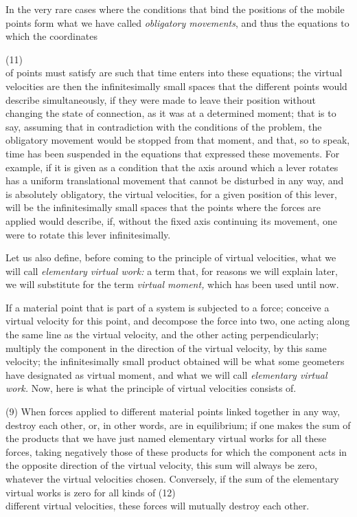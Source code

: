 \documentclass{book}
\begin{document}
In the very rare cases where the conditions that bind the positions of the mobile points form what we have called \textit{obligatory movements}, and thus the equations to which the coordinates 

\newpage
(11)\\
of points must satisfy are such that time enters into these equations; the virtual velocities are then the infinitesimally small spaces that the different points would describe simultaneously, if they were made to leave their position without changing the state of connection, as it was at a determined moment; that is to say, assuming that in contradiction with the conditions of the problem, the obligatory movement would be stopped from that moment, and that, so to speak, time has been suspended in the equations that expressed these movements. For example, if it is given as a condition that the axis around which a lever rotates has a uniform translational movement that cannot be disturbed in any way, and is absolutely obligatory, the virtual velocities, for a given position of this lever, will be the infinitesimally small spaces that the points where the forces are applied would describe, if, without the fixed axis continuing its movement, one were to rotate this lever infinitesimally.

Let us also define, before coming to the principle of virtual velocities, what we will call \textit{elementary virtual work:} a term that, for reasons we will explain later, we will substitute for the term \textit{virtual moment,} which has been used until now. 

If a material point that is part of a system is subjected to a force; conceive a virtual velocity for this point, and decompose the force into two, one acting along the same line as the virtual velocity, and the other acting perpendicularly; multiply the component in the direction of the virtual velocity, by this same velocity; the infinitesimally small product obtained will be what some geometers have designated as virtual moment, and what we will call \textit{elementary virtual work.} Now, here is what the principle of virtual velocities consists of.

(9) When forces applied to different material points linked together in any way, destroy each other, or, in other words, are in equilibrium; if one makes the sum of the products that we have just named elementary virtual works for all these forces, taking negatively those of these products for which the component acts in the opposite direction of the virtual velocity, this sum will always be zero, whatever the virtual velocities chosen. Conversely, if the sum of the elementary virtual works is zero for all kinds of 
\newpage
(12)\\
different virtual velocities, these forces will mutually destroy each other.
\end{document}
